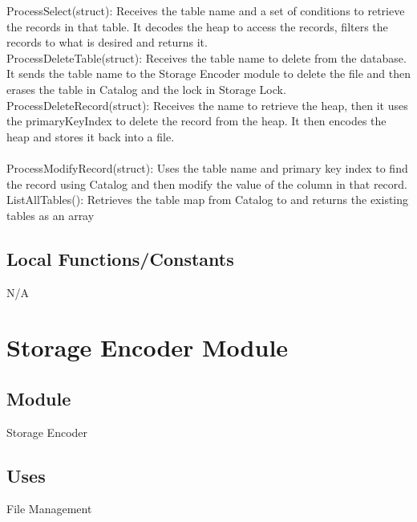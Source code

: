 \documentclass[12pt]{article}
\begin{document}
\noindent ProcessSelect({\color{red}struct}): Receives the table name and a set of conditions to retrieve the records in that table. It decodes the heap to access the records, filters the records to what is desired and returns it. \\

\noindent ProcessDeleteTable({\color{red}struct}): Receives the table name to delete from the database. It sends the table name to the Storage Encoder module to delete the file and then erases the table in Catalog and the lock in Storage Lock. \\

\noindent ProcessDeleteRecord({\color{red}struct}): Receives the name to retrieve the heap, then it uses the primaryKeyIndex to delete the record from the heap. It then encodes the heap and stores it back into a file. \\ 

 \\

\noindent ProcessModifyRecord({\color{red}struct}): Uses the table name and primary key index to find the record using Catalog and then modify the value of the column in that record. \\

\noindent ListAllTables(): Retrieves the table map from Catalog to and returns the existing tables as an array \\


\subsection{Local Functions/Constants}
N/A

\newpage

\section {Storage Encoder Module}

\subsection{Module}
Storage Encoder

\subsection {Uses}
File Management
\end{document}
